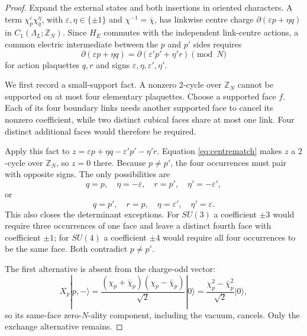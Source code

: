 \documentclass[11pt]{article}
\theoremstyle{plain}
\theoremstyle{definition}
\theoremstyle{remark}
\newcommand{\chk}[1]{}
\begin{document}
\begin{proof}
Expand the external states and both insertions in oriented characters. A term
$\chi^\varepsilon_p\chi^\eta_q$, with $\varepsilon,\eta\in\{\pm1\}$ and
$\chi^{-1}=\bar\chi$, has linkwise centre charge
$\partial(\varepsilon p+\eta q)$ in $C_1(\Lambda_L;\mathbb Z_N)$. Since $H_E$
commutes with the independent link-centre actions, a common electric
intermediate between the $p$ and $p'$ sides requires
\begin{equation}\label{eq:centrematch}
  \partial(\varepsilon p+\eta q)=\partial(\varepsilon'p'+\eta'r)\pmod N
\end{equation}
for action plaquettes $q,r$ and signs $\varepsilon,\eta,\varepsilon',\eta'$.

We first record a small-support fact. A nonzero $2$-cycle over $\mathbb Z_N$
cannot be supported on at most four elementary plaquettes. Choose a supported
face $f$. Each of its four boundary links needs another supported face to
cancel its nonzero coefficient, while two distinct cubical faces share at most
one link. Four distinct additional faces would therefore be required.
\chk{the plaquette graph is 12-regular and two faces share at most one link}

Apply this fact to $z=\varepsilon p+\eta q-\varepsilon'p'-\eta'r$. Equation
\eqref{eq:centrematch} makes $z$ a $2$-cycle over $\mathbb Z_N$, so $z=0$
there. Because $p\neq p'$, the four occurrences must pair with opposite signs.
The only possibilities are
\begin{equation}\label{eq:sameface}
  q=p,\quad \eta=-\varepsilon,\quad r=p',\quad \eta'=-\varepsilon',
\end{equation}
or
\begin{equation}\label{eq:exchange}
  q=p',\quad r=p,\quad \eta=\varepsilon',\quad \eta'=\varepsilon .
\end{equation}
This also closes the determinant exceptions. For $SU(3)$ a coefficient $\pm3$
would require three occurrences of one face and leave a distinct fourth face
with coefficient $\pm1$; for $SU(4)$ a coefficient $\pm4$ would require all
four occurrences to be the same face. Both contradict $p\neq p'$.

The first alternative is absent from the charge-odd vector:
\[
  X_p|p,-\rangle=\frac{(\chi_p+\bar\chi_p)(\chi_p-\bar\chi_p)}{\sqrt2}|0\rangle
  =\frac{\chi_p^2-\bar\chi_p^2}{\sqrt2}|0\rangle ,
\]
so its same-face zero-$N$-ality component, including the vacuum, cancels. Only
the exchange alternative remains.


\end{proof}
\end{document}
